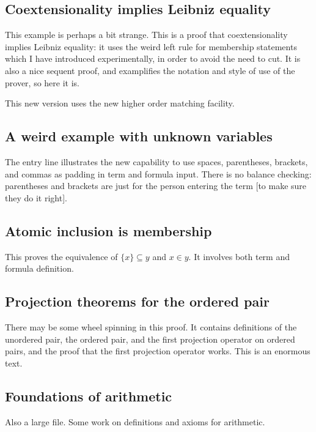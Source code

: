 \documentclass[12pt]{article}
\begin{document}
\subsection{Coextensionality implies Leibniz equality}

This example is perhaps a bit strange.  This is a proof that coextensionality implies Leibniz equality:  it uses the weird left rule for membership
statements which I have introduced experimentally, in order to avoid the need to cut.  It is also a nice sequent proof, and examplifies the notation and style of use of the prover, so here it is.


This new version uses the new higher order matching facility.





\subsection{A weird example with unknown variables}

The entry line illustrates the new capability to use spaces, parentheses, brackets, and commas as padding in term and formula input.  There is no balance checking:
parentheses and brackets are just for the person entering the term [to make sure they do it right].




\subsection{Atomic inclusion is membership}

This proves the equivalence of $\{x\} \subseteq y$ and $x \in y$.  It involves both term and formula definition.



\subsection{Projection theorems for the ordered pair}
There may be some wheel spinning in this proof.  It contains definitions of the unordered pair, the ordered pair,
and the first projection operator on ordered pairs, and the proof that the first projection operator works.  This is an enormous text.



\subsection{Foundations of arithmetic}

Also a large file.  Some work on definitions and axioms for arithmetic.


\end{document}
